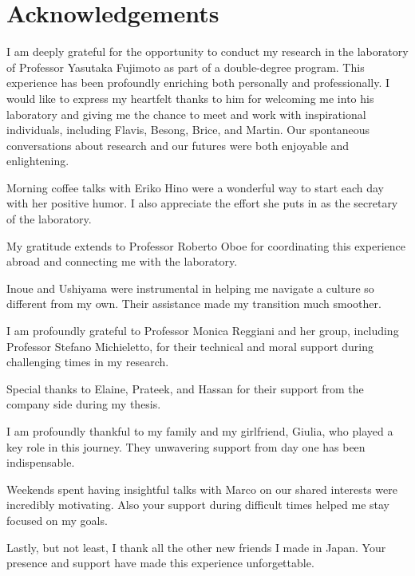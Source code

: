 \thispagestyle{empty}
\section*{Acknowledgements}
\vspace{0.5cm}
I am deeply grateful for the opportunity to conduct my research in the laboratory 
of Professor Yasutaka Fujimoto as part of a double-degree program. This experience 
has been profoundly enriching both personally and professionally. I would like 
to express my heartfelt thanks to him for welcoming me into his laboratory and 
giving me the chance to meet and work with inspirational individuals, including 
Flavis, Besong, Brice, and Martin. Our spontaneous conversations about research 
and our futures were both enjoyable and enlightening.

Morning coffee talks with Eriko Hino were a wonderful way to start each day with 
her positive humor. I also appreciate the effort she puts in as the secretary of 
the laboratory.

My gratitude extends to Professor Roberto Oboe for coordinating this experience 
abroad and connecting me with the laboratory.

Inoue and Ushiyama were instrumental in helping me navigate a culture so different 
from my own. Their assistance made my transition much smoother.

I am profoundly grateful to Professor Monica Reggiani and her group, including 
Professor Stefano Michieletto, for their technical and moral support during 
challenging times in my research.

Special thanks to Elaine, Prateek, and Hassan for their support from the company 
side during my thesis.

I am profoundly thankful to my family and my girlfriend, Giulia, who played a 
key role in this journey. They unwavering support from day one has been indispensable.

Weekends spent having insightful talks with Marco on our shared interests were 
incredibly motivating. Also your support during difficult times helped me stay 
focused on my goals.

Lastly, but not least, I thank all the other new friends I made in Japan. Your 
presence and support have made this experience unforgettable.
\afterpage{\blankpage}